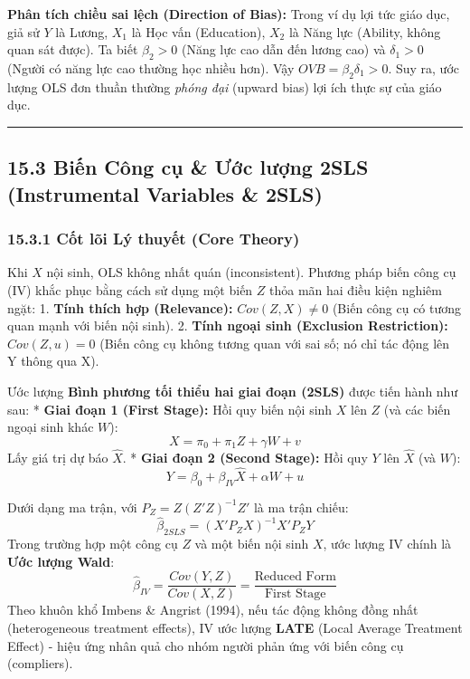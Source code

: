 \documentclass[
]{article}
\begin{document}
\textbf{Phân tích chiều sai lệch (Direction of Bias):} Trong ví dụ lợi
tức giáo dục, giả sử \(Y\) là Lương, \(X_1\) là Học vấn (Education),
\(X_2\) là Năng lực (Ability, không quan sát được). Ta biết
\(\beta_2 > 0\) (Năng lực cao dẫn đến lương cao) và \(\delta_1 > 0\)
(Người có năng lực cao thường học nhiều hơn). Vậy
\(OVB = \beta_2 \delta_1 > 0\). Suy ra, ước lượng OLS đơn thuần thường
\emph{phóng đại} (upward bias) lợi ích thực sự của giáo dục.

\begin{center}\rule{0.5\linewidth}{0.5pt}\end{center}

\subsection{15.3 Biến Công cụ \& Ước lượng 2SLS (Instrumental Variables
\&
2SLS)}\label{biux1ebfn-cuxf4ng-cux1ee5-ux1b0ux1edbc-lux1b0ux1ee3ng-2sls-instrumental-variables-2sls}

\subsubsection{15.3.1 Cốt lõi Lý thuyết (Core
Theory)}\label{cux1ed1t-luxf5i-luxfd-thuyux1ebft-core-theory-48}

Khi \(X\) nội sinh, OLS không nhất quán (inconsistent). Phương pháp biến
công cụ (IV) khắc phục bằng cách sử dụng một biến \(Z\) thỏa mãn hai
điều kiện nghiêm ngặt: 1. \textbf{Tính thích hợp (Relevance):}
\(Cov(Z, X) \neq 0\) (Biến công cụ có tương quan mạnh với biến nội
sinh). 2. \textbf{Tính ngoại sinh (Exclusion Restriction):}
\(Cov(Z, u) = 0\) (Biến công cụ không tương quan với sai số; nó chỉ tác
động lên Y thông qua X).

Ước lượng \textbf{Bình phương tối thiểu hai giai đoạn (2SLS)} được tiến
hành như sau: * \textbf{Giai đoạn 1 (First Stage):} Hồi quy biến nội
sinh \(X\) lên \(Z\) (và các biến ngoại sinh khác \(W\)):
\[ X = \pi_0 + \pi_1 Z + \gamma W + v \] Lấy giá trị dự báo \(\hat{X}\).
* \textbf{Giai đoạn 2 (Second Stage):} Hồi quy \(Y\) lên \(\hat{X}\) (và
\(W\)): \[ Y = \beta_0 + \beta_{IV} \hat{X} + \alpha W + u \]

Dưới dạng ma trận, với \(P_Z = Z(Z'Z)^{-1}Z'\) là ma trận chiếu:
\[ \hat{\beta}_{2SLS} = (X' P_Z X)^{-1} X' P_Z Y \] Trong trường hợp một
công cụ \(Z\) và một biến nội sinh \(X\), ước lượng IV chính là
\textbf{Ước lượng Wald}:
\[ \hat{\beta}_{IV} = \frac{Cov(Y, Z)}{Cov(X, Z)} = \frac{\text{Reduced Form}}{\text{First Stage}} \]
Theo khuôn khổ Imbens \& Angrist (1994), nếu tác động không đồng nhất
(heterogeneous treatment effects), IV ước lượng \textbf{LATE} (Local
Average Treatment Effect) - hiệu ứng nhân quả cho nhóm người phản ứng
với biến công cụ (compliers).
\end{document}

